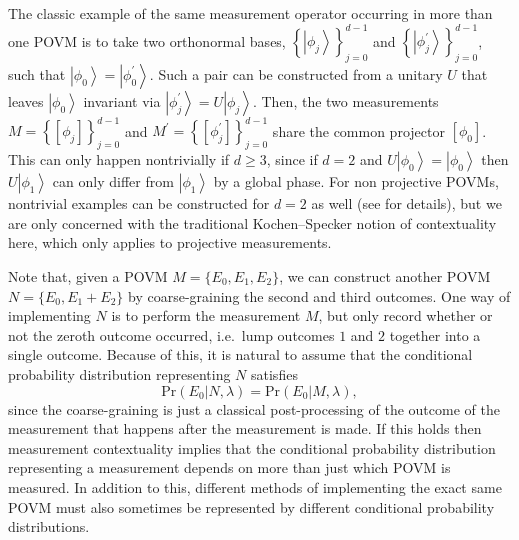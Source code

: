 \documentclass[DIV=calc,paper=a4,fontsize=11pt,twocolumn]{scrartcl} %
\theoremstyle{definition}
\theoremstyle{plain}
\newcommand{\Ket}[1]{\ensuremath{\left \vert #1 \right \rangle}}
\newcommand{\Proj}[1]{\ensuremath{\left [ #1 \right ]}}
\begin{document}
The classic example of the same measurement operator occurring in more
than one POVM is to take two orthonormal bases, $\left \{\Ket{\phi_j}
\right \}_{j=0}^{d-1}$ and $\left \{ \Ket{\phi^{\prime}_j} \right
\}_{j=0}^{d-1}$, such that $\Ket{\phi_0} = \Ket{\phi^{\prime}_0}$.
Such a pair can be constructed from a unitary $U$ that leaves
$\Ket{\phi_0}$ invariant via $\Ket{\phi^{\prime}_j} = U \Ket{\phi_j}$.
Then, the two measurements $M = \left \{ \Proj{\phi_j}\right
\}_{j=0}^{d-1}$ and $M^{\prime} = \left \{
\Proj{\phi^{\prime}_j}\right \}_{j=0}^{d-1}$ share the common
projector $\Proj{\phi_0}$.  This can only happen nontrivially if $d
\geq 3$, since if $d=2$ and $U \Ket{\phi_0} = \Ket{\phi_0}$ then
$U\Ket{\phi_1}$ can only differ from $\Ket{\phi_1}$ by a global phase.
For non projective POVMs, nontrivial examples can be constructed for
$d=2$ as well (see \cite{Spekkens2005} for details), but we are only
concerned with the traditional Kochen--Specker notion of contextuality
here, which only applies to projective measurements.

Note that, given a POVM $M = \{E_0,E_1,E_2\}$, we can construct another
POVM $N = \{E_0,E_1 + E_2\}$ by coarse-graining the second and third
outcomes.  One way of implementing $N$ is to perform the measurement
$M$, but only record whether or not the zeroth outcome occurred,
i.e.\ lump outcomes $1$ and $2$ together into a single outcome.
Because of this, it is natural to assume that the conditional
probability distribution representing $N$ satisfies
\begin{equation}
\text{Pr}(E_0|N,\lambda) = \text{Pr}(E_0|M,\lambda),
\end{equation}
since the coarse-graining is just a classical post-processing of the
outcome of the measurement that happens after the measurement is made.
If this holds then measurement contextuality implies that the
conditional probability distribution representing a measurement
depends on more than just which POVM is measured.  In addition to
this, different methods of implementing the exact same POVM must also
sometimes be represented by different conditional probability
distributions.
\end{document}
